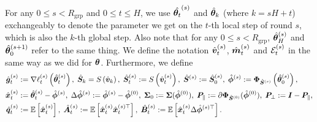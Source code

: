 For any $0 \leq s < R_{\mathrm{grp}}$ and $0 \leq t \leq H$, we use $\hat{{\bm{\theta}}_{t}}^{(s)}$ and $\hat{{\bm{\theta}}}_k$ (where $k = s H + t$) exchangeably to denote the parameter we get on the $t$-th local step of round $s$, which is also the $k$-th global step. Also note that for any $0 \leq s < R_{\text{grp}}$, $\hat{{\bm{\theta}}}_{H}^{(s)}$ and $\hat{{\bm{\theta}}}_{0}^{(s+1)}$ refer to the same thing. We define the notation $\hat{{\bm{v}}}^{(s)}_t$, $\hat{{\bm{m}}}^{(s)}_t$ and $\mathcal{E}^{(s)}_t$ in the same way as we did for ${\bm{\theta}}$. Furthermore, we define
\begin{align*}
    \hat{{\bm{g}}}_t^{(s)} &:= \nabla \ell_{t}^{(s)}\left(\hat{{\bm{\theta}}}_{t}^{(s)}\right),\;\hat{{\bm{S}}}_k = S\left(\hat{{\bm{v}}}_k\right),\;\hat{{\bm{S}}}_t^{(s)} := S\left(\hat{{\bm{v}}}_t^{(s)}\right),\;\hat{{\bm{S}}}^{(s)}:=\hat{{\bm{S}}}_0^{(s)},\;
    \hat{{\bm{\phi}}}^{(s)}:={\bm{\Phi}}_{\hat{{\bm{S}}}^{(s)}}\left(\hat{{\bm{\theta}}}_{0}^{(s)}\right),\\
    \hat{{\bm{x}}}_{t}^{(s)}&:= \hat{{\bm{\theta}}}_{t}^{(s)} - \hat{{\bm{\phi}}}^{(s)},\;\Delta \hat{{\bm{\phi}}}^{(s)}:= \hat{{\bm{\phi}}}^{(s)} - \hat{{\bm{\phi}}}^{(0)},\;{\bm{\Sigma}}_0:={\bm{\Sigma}}(\hat{{\bm{\phi}}}^{(0)}),\;{\bm{P}}_{\parallel}:=\partial {\bm{\Phi}}_{\hat{{\bm{S}}}^{(0)}}(\hat{{\bm{\phi}}}^{(0)}),\;{\bm{P}}_{\perp}:= {\bm{I}} - {\bm{P}}_{\parallel},\\
    \hat{{\bm{q}}}_{t}^{(s)} &:= \mathbb{E}\left[\hat{{\bm{x}}}_{t}^{(s)}\right],\;\hat{{\bm{A}}}_{t}^{(s)}:= \mathbb{E}\left[\hat{{\bm{x}}}_{t}^{(s)} \hat{{\bm{x}}}_{t}^{(s)\top}\right],\;\hat{{\bm{B}}}_{t}^{(s)}:= \mathbb{E}\left[\hat{{\bm{x}}}_{t}^{(s)} \Delta \hat{{\bm{\phi}}}^{(s)\top}\right].
\end{align*}

